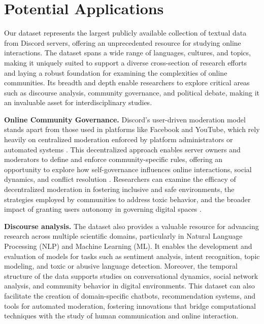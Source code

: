 
\section{Potential Applications}

Our dataset represents the largest publicly available collection of textual data from Discord servers, offering an unprecedented resource for studying online interactions. The dataset spans a wide range of languages, cultures, and topics, making it uniquely suited to support a diverse cross-section of research efforts and laying a robust foundation for examining the complexities of online communities. Its breadth and depth enable researchers to explore critical areas such as discourse analysis, community governance, and political debate, making it an invaluable asset for interdisciplinary studies.

\textbf{Online Community Governance.} Discord's user-driven moderation model stands apart from those used in platforms like Facebook and YouTube, which rely heavily on centralized moderation enforced by platform administrators or automated systems \cite{doi:10.1177/1461444818821316}. This decentralized approach enables server owners and moderators to define and enforce community-specific rules, offering an opportunity to explore how self-governance influences online interactions, social dynamics, and conflict resolution \cite{moderationbook}. Researchers can examine the efficacy of decentralized moderation in fostering inclusive and safe environments, the strategies employed by communities to address toxic behavior, and the broader impact of granting users autonomy in governing digital spaces \cite{succesfulcommunitybook}.

\textbf{Discourse analysis.} The dataset also provides a valuable resource for advancing research across multiple scientific domains, particularly in Natural Language Processing (NLP) and Machine Learning (ML). It enables the development and evaluation of models for tasks such as sentiment analysis, intent recognition, topic modeling, and toxic or abusive language detection. Moreover, the temporal structure of the data supports studies on conversational dynamics, social network analysis, and community behavior in digital environments. This dataset can also facilitate the creation of domain-specific chatbots, recommendation systems, and tools for automated moderation, fostering innovations that bridge computational techniques with the study of human communication and online interaction.

